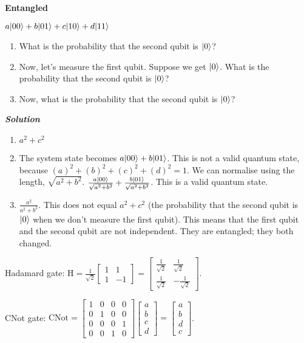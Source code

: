 \begin{exercise}
    \textbf{Entangled}

    $a\lvert00\rangle + b\lvert01\rangle + c\lvert10\rangle + d\lvert11\rangle$\\
    \begin{enumerate}
        \item What is the probability that the second qubit is $\lvert0\rangle$?
        \item Now, let's measure the first qubit. Suppose we get $\lvert0\rangle$. What is the probability that the second qubit is $\lvert0\rangle$?
        \item Now, what is the probability that the second qubit is $\lvert0\rangle$?
    \end{enumerate}
    \textbf{\emph{Solution}}
    \begin{enumerate}
        \item $a^2 + c^2$
        \item The system state becomes $a\lvert00\rangle + b\lvert01\rangle$. This is not a valid quantum state, because $(a)^2 + (b)^2 + (c)^2 + (d)^2 = 1$. We can normalise using the length, $\sqrt{a^2 + b^2}$. $\frac{a\lvert00\rangle}{\sqrt{a^2 + b^2}} + \frac{b\lvert01\rangle}{\sqrt{a^2 + b^2}}$. This is a valid quantum state.
        \item $\frac{a^2}{a^2 + b^2}$. This does not equal $a^2 + c^2$ (the probability that the second qubit is $\lvert0\rangle$ when we don't measure the first qubit). This means that the first qubit and the second qubit are not independent. They are entangled; they both changed.
    \end{enumerate}
\end{exercise}

Hadamard gate: $\mathrm{H} = \frac{1}{\sqrt{2}}\begin{bmatrix}
    1 & 1\\
    1 & -1
\end{bmatrix} = \begin{bmatrix}
    \frac{1}{\sqrt{2}} & \frac{1}{\sqrt{2}}\\
    \frac{1}{\sqrt{2}} & -\frac{1}{\sqrt{2}}
\end{bmatrix}$.

CNot gate: $\mathrm{CNot} = \begin{bmatrix}
    1 & 0 & 0 & 0\\
    0 & 1 & 0 & 0\\
    0 & 0 & 0 & 1\\
    0 & 0 & 1 & 0
\end{bmatrix} \begin{bmatrix}
    a\\
    b\\
    c\\
    d
\end{bmatrix} = \begin{bmatrix}
    a\\
    b\\
    d\\
    c
\end{bmatrix}$.

